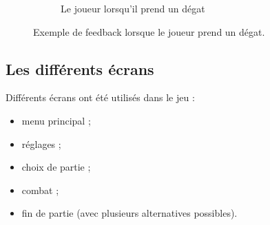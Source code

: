 \begin{figure}[ht]
\begin{subfigure}[t]{0.45\textwidth}
            \caption{Le joueur lorsqu'il prend un dégat}
        \end{subfigure}
        \caption{Exemple de feedback lorsque le joueur prend un dégat.}
        \label{fig:feedback}
    \end{figure}


\subsection{Les différents écrans}

Différents écrans ont été utilisés dans le jeu :
\begin{itemize}
    \item menu principal ;
    \item réglages ;
    \item choix de partie ;
    \item combat ;
    \item fin de partie (avec plusieurs alternatives possibles).
\end{itemize}
